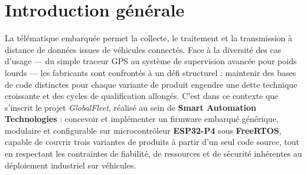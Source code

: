 \chapter*{Introduction générale}


La télématique embarquée permet la collecte, le traitement et la transmission à distance de données issues de véhicules connectés. Face à la diversité des cas d'usage — du simple traceur GPS au système de supervision avancée pour poids lourds — les fabricants sont confrontés à un défi structurel : maintenir des bases de code distinctes pour chaque variante de produit engendre une dette technique croissante et des cycles de qualification allongés. C'est dans ce contexte que s'inscrit le projet \textit{GlobalFleet}, réalisé au sein de \textbf{Smart Automation Technologies} : concevoir et implémenter un firmware embarqué générique, modulaire et configurable sur microcontrôleur \textbf{ESP32-P4} sous \textbf{FreeRTOS}, capable de couvrir trois variantes de produits à partir d'un seul code source, tout en respectant les contraintes de fiabilité, de ressources et de sécurité inhérentes au déploiement industriel sur véhicules.